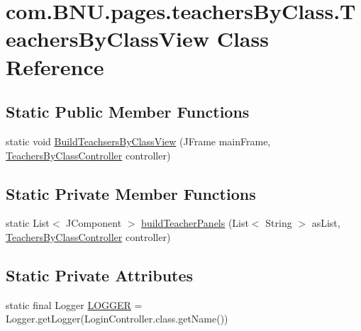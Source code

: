 \hypertarget{classcom_1_1_b_n_u_1_1pages_1_1teachers_by_class_1_1_teachers_by_class_view}{}\section{com.\+B\+N\+U.\+pages.\+teachers\+By\+Class.\+Teachers\+By\+Class\+View Class Reference}
\label{classcom_1_1_b_n_u_1_1pages_1_1teachers_by_class_1_1_teachers_by_class_view}
\subsection*{Static Public Member Functions}
\begin{DoxyCompactItemize}
\item 
static void \mbox{\hyperlink{classcom_1_1_b_n_u_1_1pages_1_1teachers_by_class_1_1_teachers_by_class_view_a5d71478cb9b4269921cfc77d3bff0e3e}{Build\+Teachsers\+By\+Class\+View}} (J\+Frame main\+Frame, \mbox{\hyperlink{classcom_1_1_b_n_u_1_1pages_1_1teachers_by_class_1_1_teachers_by_class_controller}{Teachers\+By\+Class\+Controller}} controller)
\end{DoxyCompactItemize}
\subsection*{Static Private Member Functions}
\begin{DoxyCompactItemize}
\item 
static List$<$ J\+Component $>$ \mbox{\hyperlink{classcom_1_1_b_n_u_1_1pages_1_1teachers_by_class_1_1_teachers_by_class_view_a29dd643f824848573ec326d88077e63b}{build\+Teacher\+Panels}} (List$<$ String $>$ as\+List, \mbox{\hyperlink{classcom_1_1_b_n_u_1_1pages_1_1teachers_by_class_1_1_teachers_by_class_controller}{Teachers\+By\+Class\+Controller}} controller)
\end{DoxyCompactItemize}
\subsection*{Static Private Attributes}
\begin{DoxyCompactItemize}
\item 
static final Logger \mbox{\hyperlink{classcom_1_1_b_n_u_1_1pages_1_1teachers_by_class_1_1_teachers_by_class_view_a231a795167bd2c9e7f1c231a60116609}{L\+O\+G\+G\+ER}} = Logger.\+get\+Logger(Login\+Controller.\+class.\+get\+Name())
\end{DoxyCompactItemize}


